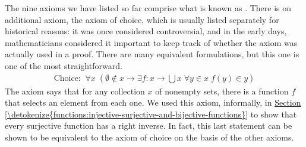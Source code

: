 \documentclass[letterpaper,10pt,english]{sphinxmanual}
\begin{document}
\sphinxAtStartPar
The nine axioms we have listed so far comprise what is known as . There is on additional axiom, the axiom of choice, which is usually listed separately for historical reasons: it was once considered controversial, and in the early days, mathematicians considered it important to keep track of whether the axiom was actually used in a proof. There are many equivalent formulations, but this one is one of the most straightforward.
\begin{equation*}
\begin{split}\text{Choice:} \;\; \forall x \; (\emptyset \notin x \rightarrow \exists f : x \to \bigcup x \; \forall y \in x \; f(y) \in y)\end{split}
\end{equation*}
\sphinxAtStartPar
The axiom says that for any collection \(x\) of nonempty sets, there is a function \(f\) that selects an element from each one. We used this axiom, informally, in \hyperref[\detokenize{functions:injective-surjective-and-bijective-functions}]{Section \ref{\detokenize{functions:injective-surjective-and-bijective-functions}}} to show that every surjective function has a right inverse. In fact, this last statement can be shown to be equivalent to the axiom of choice on the basis of the other axioms.
\end{document}
